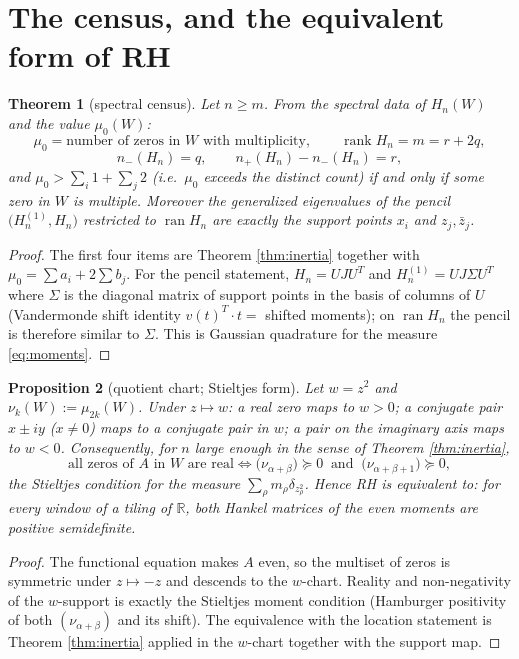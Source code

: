 \documentclass[11pt]{article}
\theoremstyle{plain}
\newtheorem{theorem}{Theorem}
\newtheorem{proposition}[theorem]{Proposition}
\theoremstyle{definition}
\theoremstyle{remark}
\newcommand{\R}{\mathbb{R}}
\DeclareMathOperator{\rank}{rank}
\DeclareMathOperator{\ran}{ran}
\begin{document}
\section{The census, and the equivalent form of RH}

\begin{theorem}[spectral census]\label{thm:census}
Let $n \ge m$. From the spectral data of $H_n(W)$ and the value $\mu_0(W)$:
\[
  \mu_0 = \text{number of zeros in } W \text{ with multiplicity},\qquad
  \rank H_n = m = r+2q,
\]
\[
  n_-(H_n) = q,\qquad n_+(H_n)-n_-(H_n) = r,
\]
and $\mu_0 > \sum_i 1 + \sum_j 2$ (i.e.\ $\mu_0$ exceeds the distinct count) if and only
if some zero in $W$ is multiple. Moreover the generalized eigenvalues of the pencil
$\bigl(H^{(1)}_n, H_n\bigr)$ restricted to $\ran H_n$ are exactly the support points
$x_i$ and $z_j,\bar z_j$.
\end{theorem}

\begin{proof}
The first four items are Theorem \ref{thm:inertia} together with $\mu_0=\sum a_i+2\sum b_j$.
For the pencil statement, $H_n = UJU^T$ and $H_n^{(1)} = U J \Sigma U^{T}$ where $\Sigma$
is the diagonal matrix of support points in the basis of columns of $U$ (Vandermonde
shift identity $v(t)^{T}\!\cdot t = $ shifted moments); on $\ran H_n$ the pencil is
therefore similar to $\Sigma$. This is Gaussian quadrature for the measure
\eqref{eq:moments}.
\end{proof}

\begin{proposition}[quotient chart; Stieltjes form]\label{prop:stieltjes}
Let $w=z^2$ and $\nu_k(W) := \mu_{2k}(W)$. Under $z\mapsto w$: a real zero maps to
$w>0$; a conjugate pair $x\pm iy$ ($x\ne0$) maps to a conjugate pair in $w$; a pair on
the imaginary axis maps to $w<0$. Consequently, for $n$ large enough in the sense of
Theorem \ref{thm:inertia},
\[
  \text{all zeros of } A \text{ in } W \text{ are real}
  \iff
  \bigl(\nu_{\alpha+\beta}\bigr) \succeq 0
  \ \text{ and }\
  \bigl(\nu_{\alpha+\beta+1}\bigr) \succeq 0 ,
\]
the Stieltjes condition for the measure $\sum_\rho m_\rho \delta_{z_\rho^2}$. Hence RH is
equivalent to: for every window of a tiling of $\R$, both Hankel matrices of the even
moments are positive semidefinite.
\end{proposition}

\begin{proof}
The functional equation makes $A$ even, so the multiset of zeros is symmetric under
$z\mapsto -z$ and descends to the $w$-chart. Reality and non-negativity of the
$w$-support is exactly the Stieltjes moment condition (Hamburger positivity of both
$(\nu_{\alpha+\beta})$ and its shift). The equivalence with the location statement is
Theorem \ref{thm:inertia} applied in the $w$-chart together with the support map.
\end{proof}
\end{document}
